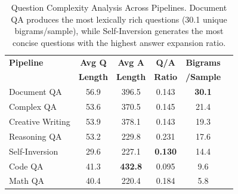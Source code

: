 \begin{table}[t]
\centering
\caption{Question Complexity Analysis Across Pipelines. Document QA produces the most lexically rich questions (30.1 unique bigrams/sample), while Self-Inversion generates the most concise questions with the highest answer expansion ratio.}
\label{tab:question_complexity}
\begin{tabular}{lccccc}
\toprule
\textbf{Pipeline} & \textbf{Avg Q} & \textbf{Avg A} & \textbf{Q/A} & \textbf{Bigrams} \\
 & \textbf{Length} & \textbf{Length} & \textbf{Ratio} & \textbf{/Sample} \\
\midrule
Document QA & 56.9 & 396.5 & 0.143 & \textbf{30.1} \\
Complex QA & 53.6 & 370.5 & 0.145 & 21.4 \\
Creative Writing & 53.9 & 378.1 & 0.143 & 19.3 \\
Reasoning QA & 53.2 & 229.8 & 0.231 & 17.6 \\
Self-Inversion & 29.6 & 227.1 & \textbf{0.130} & 14.4 \\
Code QA & 41.3 & \textbf{432.8} & 0.095 & 9.6 \\
Math QA & 40.4 & 220.4 & 0.184 & 5.8 \\
\bottomrule
\end{tabular}
\end{table}
